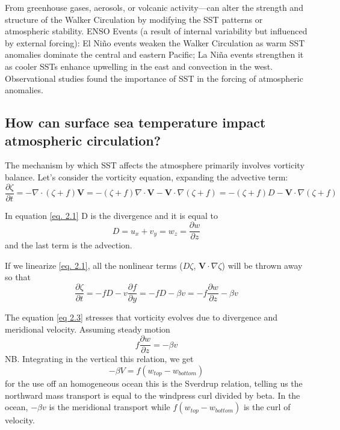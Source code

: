 From greenhouse gases, aerosols, or volcanic activity—can alter the strength and structure of the Walker Circulation by modifying the SST patterns or atmospheric stability.
ENSO Events (a result of internal variability but influenced by external forcing): El Niño events weaken the Walker Circulation as warm SST anomalies dominate the central and eastern Pacific; La Niña events strengthen it as cooler SSTs enhance upwelling in the east and convection in the west.
Observational studies found the importance of SST in the forcing of atmospheric anomalies.


\subsection{How can surface sea temperature impact atmospheric circulation?}
The mechanism by which SST affects the atmosphere primarily involves vorticity balance.
Let's consider the vorticity equation, expanding the advective term:
\begin{equation}\label{eq. 2.1}
	\frac{\partial \zeta}{\partial t} = - \nabla \cdot (\zeta + f) \mathbf{V} = - (\zeta + f) \nabla \cdot \mathbf{V} - \mathbf{V} \cdot \nabla (\zeta + f) = - (\zeta + f) D - \mathbf{V} \cdot \nabla (\zeta + f)
\end{equation}

In equation \ref{eq. 2.1} D is the divergence and it is equal to
\begin{equation}
	D=u_x + v_y = w_z = \frac{\partial w}{\partial z}
\end{equation}
and the last term is the advection.


If we linearize \ref{eq. 2.1}, all the nonlinear terms ($D\zeta$, $\mathbf{V}\cdot\nabla\zeta$) will be thrown away so that
\begin{equation}\label{eq 2.3}
	\frac{\partial \zeta}{\partial t} = - f D - v \frac{\partial f}{\partial y} = - f D - \beta v=- f \frac{\partial w}{\partial z} - \beta v
\end{equation}

The equation \ref{eq 2.3} stresses that vorticity evolves due to divergence and meridional velocity.
Assuming steady motion
\begin{equation}
	f \frac{\partial w}{\partial z} = -\beta v
\end{equation}
NB. Integrating in the vertical this relation, we get $$-\beta V=f(w_{top}-w_{bottom})$$
for the use off an homogeneous ocean this is the Sverdrup relation, telling us the northward mass transport is equal to the windpress curl divided by beta. In the ocean, $-\beta v$ is the meridional transport while $f(w_{top}-w_{bottom})$ is the curl of velocity.\\



